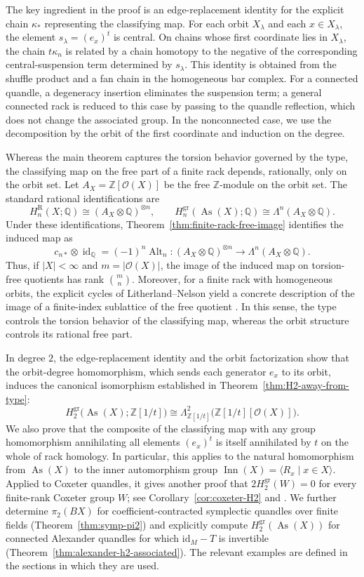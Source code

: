 \documentclass[11pt]{article}
\DeclareMathOperator{\As}{As}
\DeclareMathOperator{\Inn}{Inn}
\newcommand{\ZZ}{\mathbb Z}
\newcommand{\QQ}{\mathbb Q}
\newcommand{\OO}{\mathcal O}
\newcommand{\gr}{\mathrm{gr}}
\newcommand{\R}{\mathrm R}
\begin{document}
The key ingredient in the proof is an edge-replacement identity for the explicit chain $\kappa_*$ representing the classifying map. For each orbit $X_\lambda$ and each $x\in X_\lambda$, the element $s_\lambda=(e_x)^t$ is central. On chains whose first coordinate lies in $X_\lambda$, the chain $t\kappa_n$ is related by a chain homotopy to the negative of the corresponding central-suspension term determined by $s_\lambda$. This identity is obtained from the shuffle product and a fan chain in the homogeneous bar complex. For a connected quandle, a degeneracy insertion eliminates the suspension term; a general connected rack is reduced to this case by passing to the quandle reflection, which does not change the associated group. In the nonconnected case, we use the decomposition by the orbit of the first coordinate and induction on the degree.

Whereas the main theorem captures the torsion behavior governed by the type, the classifying map on the free part of a finite rack depends, rationally, only on the orbit set. Let $A_X=\ZZ[\OO(X)]$ be the free $\ZZ$-module on the orbit set. The standard rational identifications are
\[
 H_n^\R(X;\QQ)\cong(A_X\otimes\QQ)^{\otimes n},
 \qquad
 H_n^{\gr}(\As(X);\QQ)\cong\Lambda^n(A_X\otimes\QQ).
\]
Under these identifications, Theorem~\ref{thm:finite-rack-free-image} identifies the induced map as
\[
        c_{n*}\otimes\operatorname{id}_{\QQ}=(-1)^n\operatorname{Alt}_n
        \colon (A_X\otimes\QQ)^{\otimes n}
        \longrightarrow\Lambda^n(A_X\otimes\QQ).
\]
Thus, if $|X| < \infty$ and $m=|\OO(X)|$, the image of the induced map on torsion-free quotients has rank $\binom{m}{n}$. Moreover, for a finite rack with homogeneous orbits, the explicit cycles of Litherland--Nelson yield a concrete description of the image of a finite-index sublattice of the free quotient \cite{EtingofGrana,LitherlandNelson}. In this sense, the type controls the torsion behavior of the classifying map, whereas the orbit structure controls its rational free part.

In degree $2$, the edge-replacement identity and the orbit factorization show that the orbit-degree homomorphism, which sends each generator $e_x$ to its orbit, induces the canonical isomorphism established in Theorem~\ref{thm:H2-away-from-type}:
\[
 H_2^{\gr}\bigl(\As(X);\ZZ[1/t]\bigr)
 \cong
 \Lambda^2_{\ZZ[1/t]}\bigl(\ZZ[1/t][\OO(X)]\bigr).
\]
We also prove that the composite of the classifying map with any group homomorphism annihilating all elements $(e_x)^t$ is itself annihilated by $t$ on the whole of rack homology. In particular, this applies to the natural homomorphism from $\As(X)$ to the inner automorphism group $\Inn(X)=\langle R_x\mid x\in X\rangle$. Applied to Coxeter quandles, it gives another proof that $2H_2^{\gr}(W)=0$ for every finite-rank Coxeter group $W$; see Corollary~\ref{cor:coxeter-H2} and \cite{AkitaCoxeter,HowlettCoxeter}. We further determine $\pi_2(BX)$ for coefficient-contracted symplectic quandles over finite fields (Theorem~\ref{thm:symp-pi2}) and explicitly compute $H_2^{\gr}(\As(X))$ for connected Alexander quandles for which $\mathrm{id}_M-T$ is invertible (Theorem~\ref{thm:alexander-h2-associated}). The relevant examples are defined in the sections in which they are used.
\end{document}
